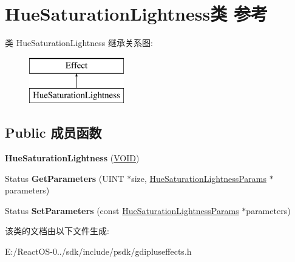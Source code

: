\hypertarget{class_hue_saturation_lightness}{}\section{Hue\+Saturation\+Lightness类 参考}
\label{class_hue_saturation_lightness}
类 Hue\+Saturation\+Lightness 继承关系图\+:\begin{figure}[H]
\begin{center}
\leavevmode
\includegraphics[height=2.000000cm]{class_hue_saturation_lightness}
\end{center}
\end{figure}
\subsection*{Public 成员函数}
\begin{DoxyCompactItemize}
\item 
\mbox{\label{class_hue_saturation_lightness_ad495fb7a26849e4404341e9a6d730bc3}} 
{\bfseries Hue\+Saturation\+Lightness} (\hyperlink{interfacevoid}{V\+O\+ID})
\item 
\mbox{\label{class_hue_saturation_lightness_a732c59974dd07fae6c52bb84f567f090}} 
Status {\bfseries Get\+Parameters} (U\+I\+NT $\ast$size, \hyperlink{struct_hue_saturation_lightness_params}{Hue\+Saturation\+Lightness\+Params} $\ast$parameters)
\item 
\mbox{\label{class_hue_saturation_lightness_a8af3752664dcf6ca76c5a72566e4b6ca}} 
Status {\bfseries Set\+Parameters} (const \hyperlink{struct_hue_saturation_lightness_params}{Hue\+Saturation\+Lightness\+Params} $\ast$parameters)
\end{DoxyCompactItemize}


该类的文档由以下文件生成\+:\begin{DoxyCompactItemize}
\item 
E\+:/\+React\+O\+S-\/0../sdk/include/psdk/gdipluseffects.\+h\end{DoxyCompactItemize}
